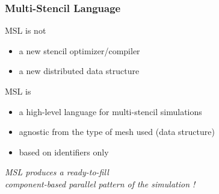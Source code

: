 \documentclass{beamer}
\begin{document}

\begin{frame}
\frametitle{Multi-Stencil Language}
\begin{alertblock}{MSL is not}
\begin{itemize}
\item a new stencil optimizer/compiler
\item a new distributed data structure
\end{itemize}
\end{alertblock}
\begin{block}{MSL is}
\begin{itemize}
\item a high-level language for multi-stencil simulations
\item agnostic from the type of mesh used (data structure)
\item based on identifiers only
\end{itemize}
\end{block}
\begin{center}
\textit{MSL produces a ready-to-fill\\component-based parallel pattern of the simulation !}
\end{center}
\end{frame}
\end{document}
